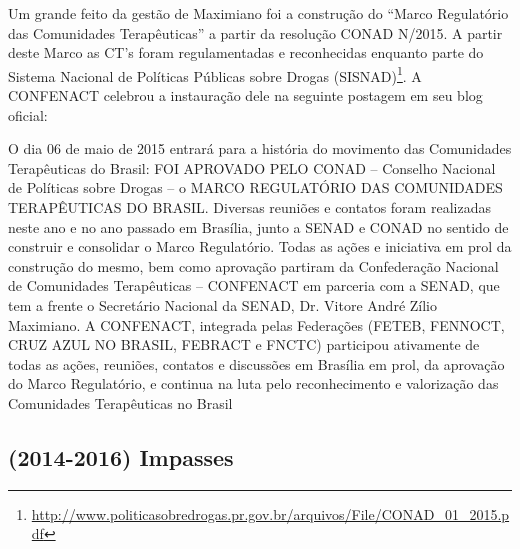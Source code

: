 \documentclass[
	12pt,				%
	oneside,			%
	a4paper,			%
	sumario=tradicional,
	english,			%
	brazil				%
	]{abntex2}
\begin{document}
Um grande feito da gestão de Maximiano foi a construção do ``Marco Regulatório das Comunidades Terapêuticas'' a partir da resolução CONAD N/2015. A partir deste Marco as CT's foram regulamentadas e reconhecidas enquanto parte do Sistema Nacional de Políticas Públicas sobre Drogas (SISNAD)\footnote{\url{http://www.politicasobredrogas.pr.gov.br/arquivos/File/CONAD_01_2015.pdf}}. A CONFENACT celebrou a instauração dele na seguinte postagem em seu blog oficial:
\begin{quoting}[rightmargin=0cm,leftmargin=4cm]
\begin{singlespace}
{\footnotesize
O dia 06 de maio de 2015 entrará para a história do movimento das Comunidades Terapêuticas do Brasil: FOI APROVADO PELO CONAD – Conselho Nacional de Políticas sobre Drogas – o MARCO REGULATÓRIO DAS COMUNIDADES TERAPÊUTICAS DO BRASIL. Diversas reuniões e contatos foram realizadas neste ano e no ano passado em Brasília, junto a SENAD e CONAD no sentido de construir e consolidar o Marco Regulatório. Todas as ações e iniciativa em prol da construção do mesmo, bem como aprovação partiram da Confederação Nacional de Comunidades Terapêuticas – CONFENACT em parceria com a SENAD, que tem a frente o Secretário Nacional da SENAD, Dr. Vitore André Zílio Maximiano. A CONFENACT, integrada pelas Federações (FETEB, FENNOCT, CRUZ AZUL NO BRASIL, FEBRACT e FNCTC) participou ativamente de todas as ações, reuniões, contatos e discussões em Brasília em prol, da aprovação do Marco Regulatório, e continua na luta pelo reconhecimento e valorização das Comunidades Terapêuticas no Brasil \cite{confenact2015}}
\end{singlespace}
\end{quoting}
\hypertarget{impasses}{%
\subsection{(2014-2016) Impasses}\label{impasses}}
\end{document}
